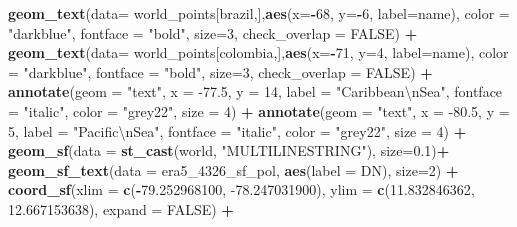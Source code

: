 \documentclass[12pt,oneside]{reedthesis}
\newenvironment{Shaded}{\begin{snugshade}}{\end{snugshade}}
\newcommand{\CharTok}[1]{\textcolor[rgb]{0.31,0.60,0.02}{#1}}
\newcommand{\DataTypeTok}[1]{\textcolor[rgb]{0.13,0.29,0.53}{#1}}
\newcommand{\DecValTok}[1]{\textcolor[rgb]{0.00,0.00,0.81}{#1}}
\newcommand{\FloatTok}[1]{\textcolor[rgb]{0.00,0.00,0.81}{#1}}
\newcommand{\KeywordTok}[1]{\textcolor[rgb]{0.13,0.29,0.53}{\textbf{#1}}}
\newcommand{\NormalTok}[1]{#1}
\newcommand{\OperatorTok}[1]{\textcolor[rgb]{0.81,0.36,0.00}{\textbf{#1}}}
\newcommand{\OtherTok}[1]{\textcolor[rgb]{0.56,0.35,0.01}{#1}}
\newcommand{\StringTok}[1]{\textcolor[rgb]{0.31,0.60,0.02}{#1}}
\begin{document}
\begin{Shaded}
\begin{Highlighting}[]
\StringTok{  }\KeywordTok{geom_text}\NormalTok{(}\DataTypeTok{data=}\NormalTok{ world_points[brazil,],}\KeywordTok{aes}\NormalTok{(}\DataTypeTok{x=}\OperatorTok{-}\DecValTok{68}\NormalTok{, }\DataTypeTok{y=}\OperatorTok{-}\DecValTok{6}\NormalTok{, }\DataTypeTok{label=}\NormalTok{name), }\DataTypeTok{color =} \StringTok{"darkblue"}\NormalTok{, }\DataTypeTok{fontface =} \StringTok{"bold"}\NormalTok{, }\DataTypeTok{size=}\DecValTok{3}\NormalTok{, }\DataTypeTok{check_overlap =} \OtherTok{FALSE}\NormalTok{) }\OperatorTok{+}
\StringTok{  }\KeywordTok{geom_text}\NormalTok{(}\DataTypeTok{data=}\NormalTok{ world_points[colombia,],}\KeywordTok{aes}\NormalTok{(}\DataTypeTok{x=}\OperatorTok{-}\DecValTok{71}\NormalTok{, }\DataTypeTok{y=}\DecValTok{4}\NormalTok{, }\DataTypeTok{label=}\NormalTok{name), }\DataTypeTok{color =} \StringTok{"darkblue"}\NormalTok{, }\DataTypeTok{fontface =} \StringTok{"bold"}\NormalTok{, }\DataTypeTok{size=}\DecValTok{3}\NormalTok{, }\DataTypeTok{check_overlap =} \OtherTok{FALSE}\NormalTok{) }\OperatorTok{+}
\StringTok{  }\KeywordTok{annotate}\NormalTok{(}\DataTypeTok{geom =} \StringTok{"text"}\NormalTok{, }\DataTypeTok{x =} \FloatTok{-77.5}\NormalTok{, }\DataTypeTok{y =} \DecValTok{14}\NormalTok{, }\DataTypeTok{label =} \StringTok{"Caribbean}\CharTok{\textbackslash{}n}\StringTok{Sea"}\NormalTok{, }\DataTypeTok{fontface =} \StringTok{"italic"}\NormalTok{, }\DataTypeTok{color =} \StringTok{"grey22"}\NormalTok{, }\DataTypeTok{size =} \DecValTok{4}\NormalTok{) }\OperatorTok{+}\StringTok{ }
\StringTok{  }\KeywordTok{annotate}\NormalTok{(}\DataTypeTok{geom =} \StringTok{"text"}\NormalTok{, }\DataTypeTok{x =} \FloatTok{-80.5}\NormalTok{, }\DataTypeTok{y =} \DecValTok{5}\NormalTok{, }\DataTypeTok{label =} \StringTok{"Pacific}\CharTok{\textbackslash{}n}\StringTok{Sea"}\NormalTok{, }\DataTypeTok{fontface =} \StringTok{"italic"}\NormalTok{, }\DataTypeTok{color =} \StringTok{"grey22"}\NormalTok{, }\DataTypeTok{size =} \DecValTok{4}\NormalTok{) }\OperatorTok{+}
\StringTok{  }\KeywordTok{geom_sf}\NormalTok{(}\DataTypeTok{data =} \KeywordTok{st_cast}\NormalTok{(world, }\StringTok{"MULTILINESTRING"}\NormalTok{),  }\DataTypeTok{size=}\FloatTok{0.1}\NormalTok{)}\OperatorTok{+}
\StringTok{  }\KeywordTok{geom_sf_text}\NormalTok{(}\DataTypeTok{data =}\NormalTok{ era5_}\DecValTok{4326}\NormalTok{_sf_pol, }\KeywordTok{aes}\NormalTok{(}\DataTypeTok{label =}\NormalTok{ DN), }\DataTypeTok{size=}\DecValTok{2}\NormalTok{) }\OperatorTok{+}
\StringTok{  }\KeywordTok{coord_sf}\NormalTok{(}\DataTypeTok{xlim =} \KeywordTok{c}\NormalTok{(}\OperatorTok{-}\FloatTok{79.252968100}\NormalTok{, }\FloatTok{-78.247031900}\NormalTok{), }\DataTypeTok{ylim =} \KeywordTok{c}\NormalTok{(}\FloatTok{11.832846362}\NormalTok{, }\FloatTok{12.667153638}\NormalTok{), }\DataTypeTok{expand =} \OtherTok{FALSE}\NormalTok{) }\OperatorTok{+}

\end{Highlighting}
\end{Shaded}
\end{document}
